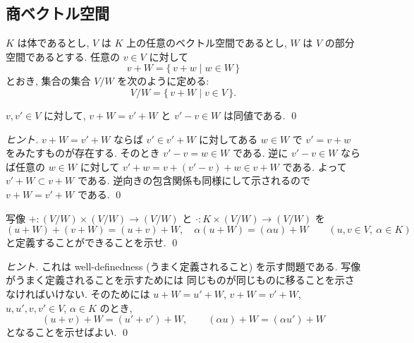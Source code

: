 \documentclass[12pt,twoside]{jarticle}
\begin{document}

\subsection{商ベクトル空間}
\label{sec:quotient-vector-space}

$K$ は体であるとし, $V$ は $K$ 上の任意のベクトル空間であるとし, 
$W$ は $V$ の部分空間であるとする.  任意の $v\in V$ に対して
\begin{equation*}
  v + W = \{\, v+w \mid w\in W \,\}
\end{equation*}
とおき, 集合の集合 $V/W$ を次のように定める:
\begin{equation*}
  V/W = \{\, v+W \mid v \in V \,\}.
\end{equation*}


\begin{question}
  \label{q:v+W}
  $v,v'\in V$ に対して, $v+W=v'+W$ と $v'-v\in W$ は同値である. \qed
\end{question}

\begin{proof}[ヒント]
  $v+W=v'+W$ ならば $v'\in v'+W$ に対してある $w\in W$ で $v'=v+w$ 
  をみたすものが存在する.  そのとき $v'-v=w\in W$ である.
  逆に $v'-v\in W$ ならば任意の $w\in W$ に対して %
  $v'+w=v+(v'-v)+w\in v+W$ である. よって $v'+W\subset v+W$ である.
  逆向きの包含関係も同様にして示されるので $v+W=v'+W$ である.
  \qed
\end{proof}


\begin{question}
  写像 $+:(V/W)\times(V/W)\to(V/W)$ と $\cdot:K\times(V/W)\to(V/W)$ を
  \begin{equation*}
    (u+W)+(v+W) = (u+v)+W, \quad
    \alpha(u+W) = (\alpha u)+W
    \qquad (u,v\in V,\ \alpha\in K)
  \end{equation*}
  と定義することができることを示せ. \qed
\end{question}

\begin{proof}[ヒント]
  これは well-definedness (うまく定義されること) を示す問題である.
  写像がうまく定義されることを示すためには
  同じものが同じものに移ることを示さなければいけない.
  そのためには $u+W=u'+W$, $v+W=v'+W$, $u,u',v,v'\in V$, $\alpha\in K$ のとき,
  \begin{equation*}
    (u+v)+W = (u'+v')+W, \qquad (\alpha u)+W = (\alpha u')+W
  \end{equation*}
  となることを示せばよい.  \qed
\end{proof}
\end{document}
